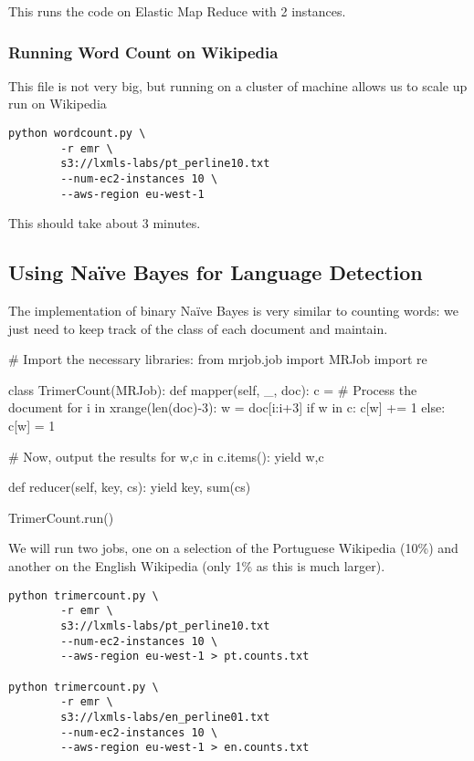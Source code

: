 This runs the code on Elastic Map Reduce with 2 instances.

\subsubsection{Running Word Count on Wikipedia}

This file is not very big, but running on a cluster of machine allows us to
scale up run on Wikipedia

\begin{verbatim}
python wordcount.py \
        -r emr \
        s3://lxmls-labs/pt_perline10.txt
        --num-ec2-instances 10 \
        --aws-region eu-west-1
\end{verbatim}

This should take about 3 minutes.

\subsection{Using Naïve Bayes for Language Detection}

The implementation of binary Naïve Bayes is very similar to counting words: we just
need to keep track of the class of each document and maintain.

\begin{python}
# Import the necessary libraries:
from mrjob.job import MRJob
import re

class TrimerCount(MRJob):
    def mapper(self, _, doc):
        c = {}
        # Process the document
        for i in xrange(len(doc)-3):
            w = doc[i:i+3]
            if w in c:
                c[w] += 1
            else:
                c[w] = 1

        # Now, output the results
        for w,c in c.items():
            yield w,c

    def reducer(self, key, cs):
        yield key, sum(cs)

TrimerCount.run()
\end{python}

We will run two jobs, one on a selection of the Portuguese Wikipedia (10\%) and
another on the English Wikipedia (only 1\% as this is much larger).

\begin{verbatim}
python trimercount.py \
        -r emr \
        s3://lxmls-labs/pt_perline10.txt
        --num-ec2-instances 10 \
        --aws-region eu-west-1 > pt.counts.txt

python trimercount.py \
        -r emr \
        s3://lxmls-labs/en_perline01.txt
        --num-ec2-instances 10 \
        --aws-region eu-west-1 > en.counts.txt
\end{verbatim}

